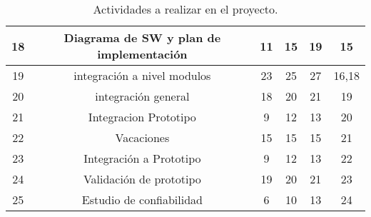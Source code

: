 \begin{table}[H]
\begin{tabular}{|c|c|c|c|c|c|}
18          & Diagrama de SW y plan de implementación & 11                          & 15                & 19                          & 15                                        \\ \hline
19          & integración a nivel modulos             & 23                          & 25                & 27                          & 16,18                                     \\ \hline
20          & integración general                     & 18                          & 20                & 21                          & 19                                        \\ \hline
21          & Integracion Prototipo                   & 9                           & 12                & 13                          & 20                                        \\ \hline
22          & Vacaciones                              & 15                          & 15                & 15                          & 21                                        \\ \hline
23          & Integración a Prototipo                 & 9                           & 12                & 13                          & 22                                        \\ \hline
24          & Validación de prototipo                 & 19                          & 20                & 21                          & 23                                        \\ \hline
25          & Estudio de confiabilidad                & 6                           & 10                & 13                          & 24                                        \\ \hline
\end{tabular}
\caption{Actividades a realizar en el proyecto.}
\label{tab:tareas}
\end{table}









